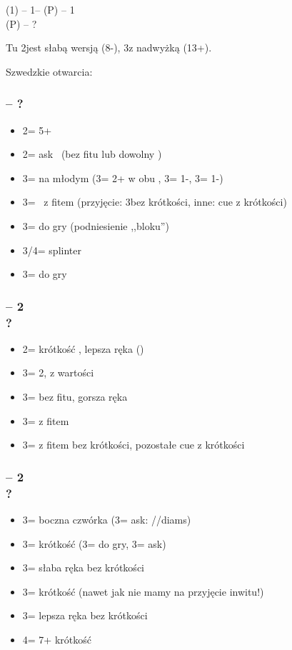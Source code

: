 \documentclass[12pt, a4paper]{report}
\begin{document}
\noindent
(1\clubs) -- 1\hearts -- (P) -- 1\nt\\
(P) -- ?

Tu 2\hearts jest słabą wersją (8-), 3\hearts z nadwyżką (13+).

\vspace{0.5cm}

Szwedzkie otwarcia:

\subsubsection*{\alrts{2\hearts} -- ?}
\begin{itemize}
    \item 2\spades = 5+\spades\ \fonce
    \item 2\nt = ask \invp\ (bez fitu lub dowolny \gf)
    \item 3\clubs = \gf na młodym (3\diams = 2+ w obu \minor, 3\hearts = 1-\clubs, 3\spades = 1-\diams)
    \item 3\diams = \invp\ z fitem (przyjęcie: 3\nt bez krótkości, inne: cue z krótkości)
    \item 3\hearts = do gry (podniesienie ,,bloku'')
    \item 3\spades/4\minor = splinter
    \item 3\nt = do gry
\end{itemize}

\subsubsection*{\alrts{2\hearts} -- 2\spades \\ ?}
\begin{itemize}
    \item 2\nt = krótkość \spades, lepsza ręka (\hearts)
    \item 3\minor = 2\spades, z wartości
    \item 3\hearts = bez fitu, gorsza ręka
    \item 3\spades = z fitem \nf
    \item 3\nt = z fitem bez krótkości, pozostałe cue z krótkości
\end{itemize}

\subsubsection*{\alrts{2\hearts} -- 2\nt \\ ?}
\begin{itemize}
    \item 3\clubs = boczna czwórka (3\diams = ask: \spades/\clubs/diams)
    \item 3\diams = krótkość \minor (3\hearts = do gry, 3\spades = ask)
    \item 3\hearts = słaba ręka bez krótkości
    \item 3\spades = krótkość \spades (nawet jak nie mamy na przyjęcie inwitu!)
    \item 3\nt = lepsza ręka bez krótkości
    \item 4\minor = 7\hearts + krótkość
\end{itemize}
\end{document}
